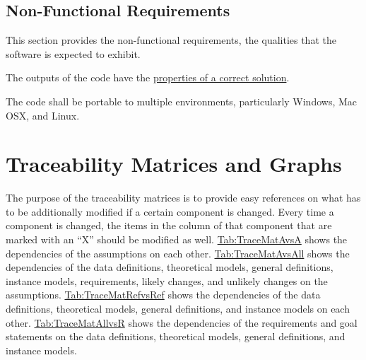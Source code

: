 \documentclass[12pt]{article}
\begin{document}
{\subsection{Non-Functional Requirements}
\label{Sec:NFRs}
This section provides the non-functional requirements, the qualities that the software is expected to exhibit.

\begin{description}[font=\normalfont]
\item[Correctness:\phantomsection\label{correct}]{The outputs of the code have the \hyperref[Sec:CorSolProps]{properties of a correct solution}.}
\item[Portability:\phantomsection\label{portable}]{The code shall be portable to multiple environments, particularly Windows, Mac OSX, and Linux.}
\end{description}
\section{Traceability Matrices and Graphs}
\label{Sec:TraceMatrices}
The purpose of the traceability matrices is to provide easy references on what has to be additionally modified if a certain component is changed. Every time a component is changed, the items in the column of that component that are marked with an ``X'' should be modified as well. \hyperref[Table:TraceMatAvsA]{Tab:TraceMatAvsA} shows the dependencies of the assumptions on each other. \hyperref[Table:TraceMatAvsAll]{Tab:TraceMatAvsAll} shows the dependencies of the data definitions, theoretical models, general definitions, instance models, requirements, likely changes, and unlikely changes on the assumptions. \hyperref[Table:TraceMatRefvsRef]{Tab:TraceMatRefvsRef} shows the dependencies of the data definitions, theoretical models, general definitions, and instance models on each other. \hyperref[Table:TraceMatAllvsR]{Tab:TraceMatAllvsR} shows the dependencies of the requirements and goal statements on the data definitions, theoretical models, general definitions, and instance models.

}
\end{document}
